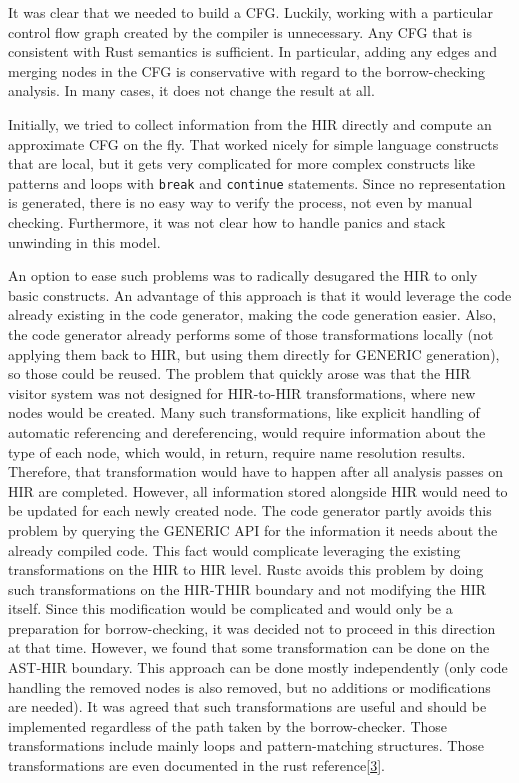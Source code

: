 \documentclass[
  11pt,
  twoside,symmetric]{report}
\begin{document}
It was clear that we needed to build a CFG. Luckily, working with a
particular control flow graph created by the compiler is unnecessary.
Any CFG that is consistent with Rust semantics is sufficient. In
particular, adding any edges and merging nodes in the CFG is
conservative with regard to the borrow-checking analysis. In many cases,
it does not change the result at all.

Initially, we tried to collect information from the HIR directly and
compute an approximate CFG on the fly. That worked nicely for simple
language constructs that are local, but it gets very complicated for
more complex constructs like patterns and loops with \texttt{break} and
\texttt{continue} statements. Since no representation is generated,
there is no easy way to verify the process, not even by manual checking.
Furthermore, it was not clear how to handle panics and stack unwinding
in this model.

An option to ease such problems was to radically desugared the HIR to
only basic constructs. An advantage of this approach is that it would
leverage the code already existing in the code generator, making the
code generation easier. Also, the code generator already performs some
of those transformations locally (not applying them back to HIR, but
using them directly for GENERIC generation), so those could be reused.
The problem that quickly arose was that the HIR visitor system was not
designed for HIR-to-HIR transformations, where new nodes would be
created. Many such transformations, like explicit handling of automatic
referencing and dereferencing, would require information about the type
of each node, which would, in return, require name resolution results.
Therefore, that transformation would have to happen after all analysis
passes on HIR are completed. However, all information stored alongside
HIR would need to be updated for each newly created node. The code
generator partly avoids this problem by querying the GENERIC API for the
information it needs about the already compiled code. This fact would
complicate leveraging the existing transformations on the HIR to HIR
level. Rustc avoids this problem by doing such transformations on the
HIR-THIR boundary and not modifying the HIR itself. Since this
modification would be complicated and would only be a preparation for
borrow-checking, it was decided not to proceed in this direction at that
time. However, we found that some transformation can be done on the
AST-HIR boundary. This approach can be done mostly independently (only
code handling the removed nodes is also removed, but no additions or
modifications are needed). It was agreed that such transformations are
useful and should be implemented regardless of the path taken by the
borrow-checker. Those transformations include mainly loops and
pattern-matching structures. Those transformations are even documented
in the rust reference\protect\hyperlink{ref-reference}{{[}3{]}}.
\end{document}
